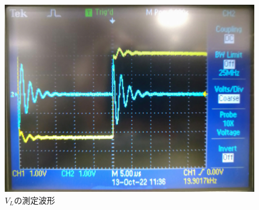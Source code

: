   \begin{figure}[H]
    \begin{center}
        \includegraphics[keepaspectratio, scale=0.3]{DSC_0240.pdf}
        \caption{$V_L$の測定波形}
    \end{center}
\end{figure}